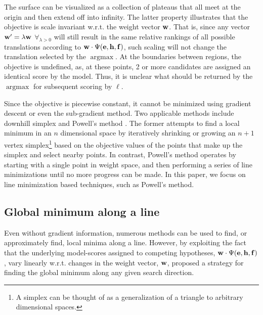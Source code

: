 \documentclass[11pt]{article}
\DeclareMathOperator*{\argmax}{argmax}
\begin{document}
The surface can be visualized as a collection of plateaus that all meet at the origin and then extend off into infinity. The latter property illustrates that the objective is scale invariant w.r.t. the weight vector \mbox{${\bf w}$}. That is, since any vector \mbox{${\bf w}^\prime = \lambda {\bf w}$} \mbox{$\forall_{\lambda > 0}$} will still result in the same relative rankings of all possible translations according to \mbox{${\bf w} \cdot \Psi({\bf e}, {\bf h}, {\bf f})$}, such scaling will not change the translation selected by the \mbox{$\argmax$}. At the boundaries between regions, the objective is undefined, as, at these points, 2 or more candidates are assigned an identical score by the model. Thus, it is unclear what should be returned by the \mbox{$\argmax$} for subsequent scoring by \mbox{$\ell$}.

Since the objective is piecewise constant, it cannot be minimized using gradient descent or even the sub-gradient method. Two applicable methods include downhill simplex and Powell's method \cite{press2007}. The former attempts to find a local minimum in an \mbox{$n$} dimensional space by iteratively shrinking or growing an \mbox{$n+1$} vertex simplex\footnote{A simplex can be thought of as a generalization of a triangle to arbitrary dimensional spaces.} based on the objective values of the points that make up the simplex and select nearby points.	In contrast, Powell's method operates by starting with a single point in weight space, and then performing a series of line minimizations until no more progress can be made. In this paper, we focus on line minimization based techniques, such as Powell's method.  

\subsection{Global minimum along a line}

Even without gradient information, numerous methods can be used to find, or approximately find, local minima along a line. However, by exploiting the fact that the underlying model-scores assigned to competing hypotheses,  \mbox{${\bf w} \cdot \Psi({\bf e}, {\bf h}, {\bf f})$}, vary linearly w.r.t. changes in the weight vector, \mbox{${\bf w}$},  proposed a strategy for finding the global minimum along any given search direction. 
\end{document}
